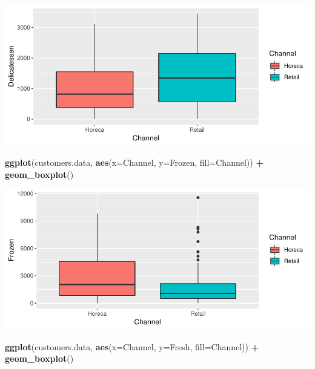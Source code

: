 \documentclass[]{article}
\newenvironment{Shaded}{\begin{snugshade}}{\end{snugshade}}
\newcommand{\KeywordTok}[1]{\textcolor[rgb]{0.13,0.29,0.53}{\textbf{#1}}}
\newcommand{\DataTypeTok}[1]{\textcolor[rgb]{0.13,0.29,0.53}{#1}}
\newcommand{\StringTok}[1]{\textcolor[rgb]{0.31,0.60,0.02}{#1}}
\newcommand{\OperatorTok}[1]{\textcolor[rgb]{0.81,0.36,0.00}{\textbf{#1}}}
\newcommand{\NormalTok}[1]{#1}
\begin{document}
\begin{center}\includegraphics{7._K-means_Clustering_files/figure-latex/unnamed-chunk-8-3} \end{center}

\begin{Shaded}
\begin{Highlighting}[]
\KeywordTok{ggplot}\NormalTok{(customers.data, }\KeywordTok{aes}\NormalTok{(}\DataTypeTok{x=}\NormalTok{Channel, }\DataTypeTok{y=}\NormalTok{Frozen, }\DataTypeTok{fill=}\NormalTok{Channel)) }\OperatorTok{+}\StringTok{ }\KeywordTok{geom_boxplot}\NormalTok{()}
\end{Highlighting}
\end{Shaded}

\begin{center}\includegraphics{7._K-means_Clustering_files/figure-latex/unnamed-chunk-8-4} \end{center}

\begin{Shaded}
\begin{Highlighting}[]
\KeywordTok{ggplot}\NormalTok{(customers.data, }\KeywordTok{aes}\NormalTok{(}\DataTypeTok{x=}\NormalTok{Channel, }\DataTypeTok{y=}\NormalTok{Fresh, }\DataTypeTok{fill=}\NormalTok{Channel)) }\OperatorTok{+}\StringTok{ }\KeywordTok{geom_boxplot}\NormalTok{()}
\end{Highlighting}
\end{Shaded}
\end{document}
